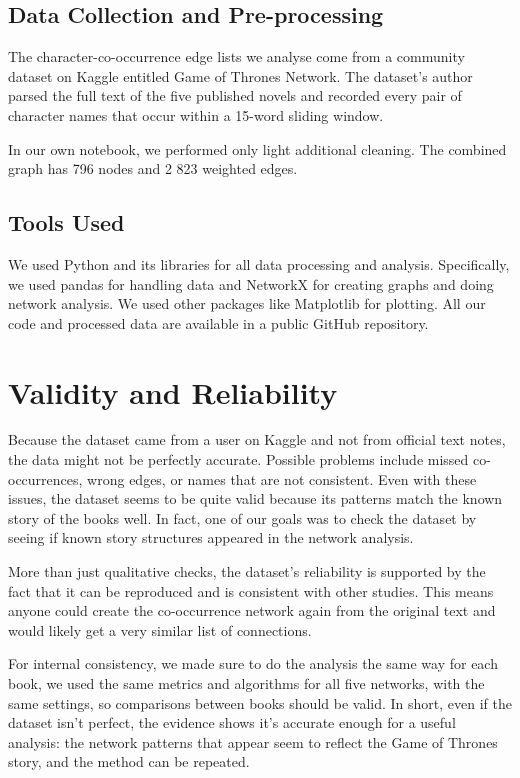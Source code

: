 \documentclass[12pt, a4paper]{article}
\begin{document}
	
	\subsection*{Data Collection and Pre-processing}
	
	The character-co-occurrence edge lists we analyse come from a community dataset on Kaggle entitled Game of Thrones Network.
	The dataset's author parsed the full text of the five published novels and recorded every pair of character names that occur within a 15-word sliding window.
	
	In our own notebook, we performed only light additional cleaning. 
	The combined graph has 796 nodes and 2 823 weighted edges.
	
	\subsection*{Tools Used}
	We used Python and its libraries for all data processing and analysis. Specifically, we used pandas for handling data and NetworkX for creating graphs and doing network analysis. We used other packages like Matplotlib for plotting.  All our code and processed data are available in a public GitHub repository.
	\section{Validity and Reliability}
	
	\label{validity-and-reliability}
	Because the dataset came from a user on Kaggle and not from official text notes, the data might not be perfectly accurate. Possible problems include missed co-occurrences, wrong edges, or names that are not consistent. Even with these issues, the dataset seems to be quite valid because its patterns match the known story of the books well. In fact, one of our goals was to check the dataset by seeing if known story structures appeared in the network analysis. 
	
	More than just qualitative checks, the dataset's reliability is supported by the fact that it can be reproduced and is consistent with other studies. This means anyone could create the co-occurrence network again from the original text and would 
	likely get a very similar list of connections. 
	
	
	For internal consistency, we made sure to do the analysis the same way for each book, we used the same metrics and algorithms 
	for all five networks, with the same settings, so comparisons between books should be valid. In short, even if the dataset isn't perfect, 
	the evidence shows it's accurate enough for a useful analysis: the network patterns that appear seem to reflect the Game of Thrones story, 
	and the method can be repeated. 
	
\end{document}
